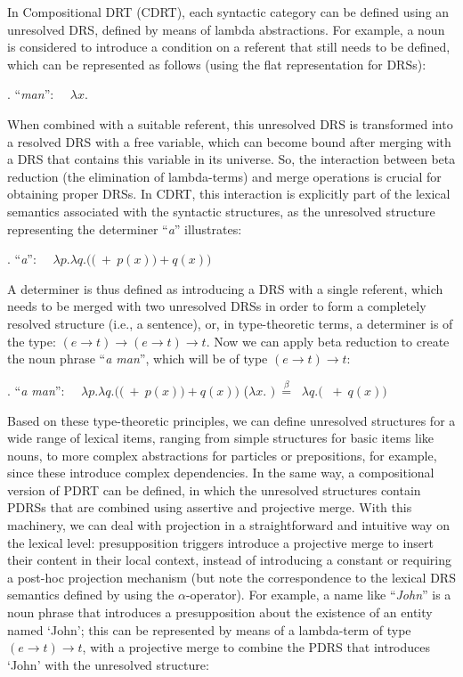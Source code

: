 In Compositional DRT (CDRT), each syntactic category can be defined using an
unresolved DRS, defined by means of lambda abstractions. For example, a noun
is considered to introduce a condition on a referent that still needs to be
defined, which can be represented as follows (using the flat representation
for DRSs): 

\ex. ``\textit{man}'':~~ $\lambda x.$

When combined with a suitable referent, this unresolved DRS is transformed
into a resolved DRS with a free variable, which can become bound after
merging with a DRS that contains this variable in its universe. So, the
interaction between beta reduction (the elimination of lambda-terms) and
merge operations is crucial for obtaining proper DRSs. In CDRT, this
interaction is explicitly part of the lexical semantics associated with the
syntactic structures, as the unresolved structure representing the
determiner ``\textit{a}'' illustrates: 

\ex. ``\textit{a}'':~~ 
  $\lambda p.\lambda q.(($$~+~p(x))+q(x))$

A determiner is thus defined as introducing a DRS with a single referent,
which needs to be merged with two unresolved DRSs in order to form
a completely resolved structure (i.e., a sentence), or, in type-theoretic
terms, a determiner is of the type: $(e\rightarrow t)\rightarrow
(e\rightarrow t) \rightarrow t$. Now we can apply beta reduction to create
the noun phrase ``\textit{a man}'', which will be of type $(e\rightarrow t)
\rightarrow t$:

\ex. ``\textit{a man}'':~~ 
  $\lambda p.\lambda q.(($$~+~p(x))+q(x))$ ($\lambda x.$
  $)~\stackrel{\beta}{=}~$ $\lambda q.($
  $~+~q(x))$ 

Based on these type-theoretic principles, we can define unresolved
structures for a wide range of lexical items, ranging from simple structures
for basic items like nouns, to more complex abstractions for particles or
prepositions, for example, since these introduce complex dependencies.  In
the same way, a compositional version of PDRT can be defined, in which the
unresolved structures contain PDRSs that are combined using assertive and
projective merge. With this machinery, we can deal with projection in
a straightforward and intuitive way on the lexical level: presupposition
triggers introduce a projective merge to insert their content in their local
context, instead of introducing a constant
 or requiring
a post-hoc projection mechanism 
(but note the correspondence to the lexical DRS semantics defined by
 using the $\alpha$-operator).  For example,
a name like ``\emph{John}'' is a noun phrase that introduces
a presupposition about the existence of an entity named `John'; this can be
represented by means of a lambda-term of type $(e\rightarrow t)\rightarrow
t$, with a projective merge to combine the PDRS that introduces `John' with
the unresolved structure:

